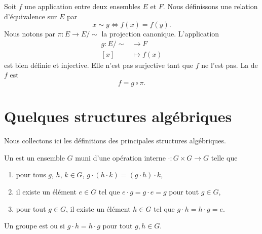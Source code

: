 \begin{example}
	Soit \( f\) une application entre deux ensembles \( E\) et \( F\). Nous définissons une relation d'équivalence sur \( E\) par
	\begin{equation}
		x\sim y\Leftrightarrow f(x)=f(y).
	\end{equation}
	Nous notons par \( \pi\colon E\to E/\sim\) la projection canonique. L'application
	\begin{equation}
		\begin{aligned}
			g\colon E/\sim & \to F        \\
			[x]            & \mapsto f(x)
		\end{aligned}
	\end{equation}
	est bien définie et injective. Elle n'est pas surjective tant que \( f\) ne l'est pas. La  de \( f\) est
	\begin{equation}
		f=g\circ\pi.
	\end{equation}
\end{example}

\section{Quelques structures algébriques}

Nous collectons ici les définitions des principales structures algébriques.

\begin{definition}[Groupe]      \label{DEFooBMUZooLAfbeM}
	Un  est un ensemble \( G\) muni d'une opération interne \( \cdot\colon G\times G\to G\) telle que
	\begin{enumerate}
		\item
		      pour tous \( g\), \( h\), \( k\in G\), \( g\cdot(h\cdot k)=(g\cdot h)\cdot k\),
		\item
		      il existe un élément \( e\in G\) tel que \( e\cdot g=g\cdot e=g\) pour tout \( g\in G\),
		\item
		      pour tout \( g\in G\), il existe un élément \( h\in  G\) tel que \(g\cdot h=h\cdot g=e \).
	\end{enumerate}
	Un groupe est  ou  si \( g\cdot h=h\cdot g\) pour tout \( g,h\in G\).
\end{definition}

